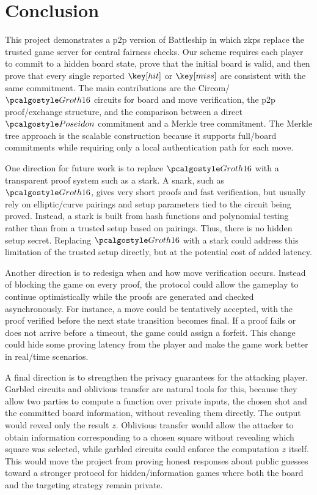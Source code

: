 \section{Conclusion}
\label{sec:conclusion}

This project demonstrates a \gls{p2p} version of Battleship in which \glspl{zkp} replace the trusted game server for central fairness checks. Our scheme requires each player to commit to a hidden board state, prove that the initial board is valid, and then prove that every single reported $\hit$ or $\miss$ are consistent with the same commitment. The main contributions are the Circom/$\groth$ circuits for board and move verification, the \gls{p2p} proof\-/exchange structure, and the comparison between a direct $\poseidon$ commitment and a Merkle tree commitment. The Merkle tree approach is the scalable construction because it supports full\-/board commitments while requiring only a local authentication path for each move.

One direction for future work is to replace $\groth$ with a transparent proof system such as a \gls{stark}. A \gls{snark}, such as $\groth$, gives very short proofs and fast verification, but usually rely on elliptic\-/curve pairings and setup parameters tied to the circuit being proved. Instead, a \gls{stark} is built from hash functions and polynomial testing rather than from a trusted setup based on pairings. Thus, there is no hidden setup secret. Replacing $\groth$ with a \gls{stark} could address this limitation of the trusted setup directly, but at the potential cost of added latency.

Another direction is to redesign when and how move verification occurs. Instead of blocking the game on every proof, the protocol could allow the gameplay to continue optimistically while the proofs are generated and checked asynchronously. For instance, a move could be tentatively accepted, with the proof verified before the next state transition becomes final. If a proof fails or does not arrive before a timeout, the game could assign a forfeit. This change could hide some proving latency from the player and make the game work better in real\-/time scenarios.

A final direction is to strengthen the privacy guarantees for the attacking player. Garbled circuits \cite{yao86} and oblivious transfer \cite{rabin81,even85} are natural tools for this, because they allow two parties to compute a function over private inputs, the chosen shot and the committed board information, without revealing them directly. The output would reveal only the result $z$. Oblivious transfer would allow the attacker to obtain information corresponding to a chosen square without revealing which square was selected, while garbled circuits could enforce the computation $z$ itself. This would move the project from proving honest responses about public guesses toward a stronger protocol for hidden\-/information games where both the board and the targeting strategy remain private.
